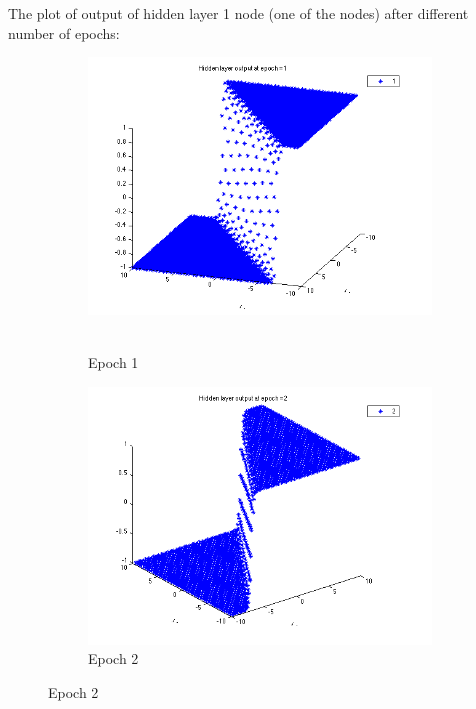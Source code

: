 The plot of output of hidden layer 1 node (one of the nodes) after different number of epochs:

\begin{figure}
\begin{subfigure}{.5\textwidth}
  \centering
  \includegraphics[width=.8\linewidth]{Regression/bivariate/hidden_2layer_1.png}\
  \caption{Epoch 1}
\end{subfigure}%
\begin{subfigure}{.5\textwidth}
  \centering
  \includegraphics[width=.8\linewidth]{Regression/bivariate/hidden_2layer_2.png}
   \caption{Epoch 2}
  \end{subfigure}
  

\end{figure}
